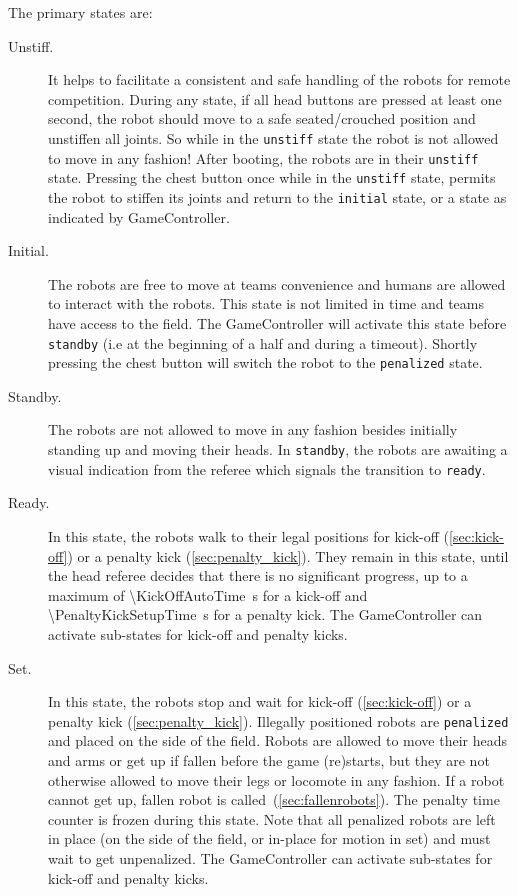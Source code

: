The primary states are:
\begin{description}
  \item[Unstiff.] It helps to facilitate a consistent and safe handling of the robots for remote competition.
    During any state, if all head buttons are pressed at least one second, the robot should move to a safe seated/crouched position and unstiffen all joints.
    So while in the \texttt{unstiff} state the robot is not allowed to move in any fashion! After booting, the robots are in their \texttt{unstiff} state.
    Pressing the chest button once while in the \texttt{unstiff} state, permits the robot to stiffen its joints and return to the \texttt{initial} state, or a state as indicated by GameController.

    \item[Initial.] The robots are free to move at teams convenience and humans are allowed to interact with the robots.
    This state is not limited in time and teams have access to the field.
    The GameController will activate this state before \texttt{standby} (i.e at the beginning of a half and during a timeout).
    Shortly pressing the chest button will switch the robot to the \texttt{penalized} state.

    \item[Standby.] The robots are not allowed to move in any fashion besides initially standing up and moving their heads.
    In \texttt{standby}, the robots are awaiting a visual indication from the referee which signals the transition to \texttt{ready}.

  \item[Ready.] In this state, the robots walk to their legal positions for kick-off (\cf \cref{sec:kick-off}) or a penalty kick (\cf \cref{sec:penalty_kick}).
    They remain in this state, until the head referee decides that there is no significant progress, up to a maximum of \qty{\KickOffAutoTime}{\second} for a kick-off and \qty{\PenaltyKickSetupTime}{\second} for a penalty kick.
    The GameController can activate sub-states for kick-off and penalty kicks.

  \item[Set.] In this state, the robots stop and wait for kick-off (\cf \cref{sec:kick-off}) or a penalty kick (\cf \cref{sec:penalty_kick}).
    Illegally positioned robots are \texttt{penalized} and placed on the side of the field.
    Robots are allowed to move their heads and arms or get up if fallen before the game (re)starts, but they are not otherwise allowed to move their legs or locomote in any fashion.
    If a robot cannot get up, fallen robot is called~(\cf \cref{sec:fallenrobots}).
    The penalty time counter is frozen during this state.
    Note that all penalized robots are left in place (on the side of the field, or in-place for motion in set) and must wait to get unpenalized.
    The GameController can activate sub-states for kick-off and penalty kicks.


\end{description}
